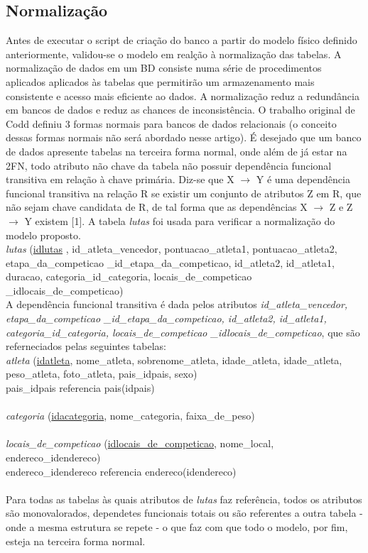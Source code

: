 \documentclass[10pt]{article}
\begin{document}
\begin{multicols}{2}
\subsection{Normalização}
Antes de executar o script de criação do banco a partir do modelo físico definido anteriormente, validou-se o modelo em realção à normalização das tabelas. A normalização de dados em um BD consiste numa série de procedimentos aplicados aplicados às tabelas que permitirão um armazenamento mais consistente e acesso mais eficiente ao dados. A normalização reduz a redundância em bancos de dados e reduz as chances de inconsistência. O trabalho original de Codd definiu 3 formas normais para bancos de dados relacionais (o conceito dessas formas normais não será abordado nesse artigo). É desejado que um banco de dados apresente tabelas na terceira forma normal, onde além de já estar na 2FN, todo atributo não chave da tabela não possuir dependência funcional transitiva em relação à chave primária. Diz-se que X $\rightarrow$ Y é uma dependência funcional transitiva na relação R se
existir um conjunto de atributos Z em R, que não sejam chave candidata de R, de tal forma que as dependências X $\rightarrow$ Z e Z $\rightarrow$ Y existem [1]. A tabela \emph{lutas} foi usada para verificar a normalização do modelo proposto.
\\ 
\emph{ lutas} (\underline{idlutas} , id\_atleta\_vencedor,  pontuacao\_atleta1,  pontuacao\_atleta2, etapa\_da\_competicao \_id\_etapa\_da\_competicao, id\_atleta2, id\_atleta1,  duracao, categoria\_id\_categoria, locais\_de\_competicao \_idlocais\_de\_competicao)
\\
A dependência funcional transitiva é dada pelos atributos \emph{  id\_atleta\_vencedor, etapa\_da\_competicao \_id\_etapa\_da\_competicao, id\_atleta2, id\_atleta1, categoria\_id\_categoria, locais\_de\_competicao \_idlocais\_de\_competicao}, que são referneciados pelas seguintes tabelas:
\\ 
\emph{atleta} (\underline{idatleta}, nome\_atleta, sobrenome\_atleta, idade\_atleta, idade\_atleta, peso\_atleta, foto\_atleta, pais\_idpais, sexo)
\\
pais\_idpais referencia pais(idpais)
\\ \\
\emph{categoria} (\underline{idacategoria}, nome\_categoria, faixa\_de\_peso)
\\ \\
\emph{locais\_de\_competicao} (\underline{idlocais\_de\_competicao}, nome\_local, endereco\_idendereco)
\\ endereco\_idendereco referencia endereco(idendereco)
\\ \\
Para todas as tabelas às quais atributos de \emph{lutas} faz referência, todos os atributos  são monovalorados, dependetes funcionais totais ou são referentes a outra tabela - onde a mesma estrutura se repete - o que faz com que todo o modelo, por fim, esteja na terceira forma normal.
\end{multicols}
\end{document}
